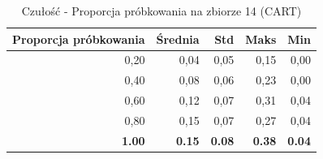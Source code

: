 \begin{table}[htbp]
\centering
\small
\setlength{\tabcolsep}{6pt}
\renewcommand{\arraystretch}{1.2}
\caption{Czułość - Proporcja próbkowania na zbiorze 14 (CART)}
\label{tab:CART_sample_ratio_14_recall}
\begin{tabular}{r|r|r|r|r}
\toprule
Proporcja próbkowania & Średnia & Std & Maks & Min \\
\hline
0,20 & 0,04 & 0,05 & 0,15 & 0,00 \\
0,40 & 0,08 & 0,06 & 0,23 & 0,00 \\
0,60 & 0,12 & 0,07 & 0,31 & 0,04 \\
0,80 & 0,15 & 0,07 & 0,27 & 0,04 \\
\textbf{1.00} & \textbf{0.15} & \textbf{0.08} & \textbf{0.38} & \textbf{0.04} \\
\bottomrule
\end{tabular}
\end{table}
